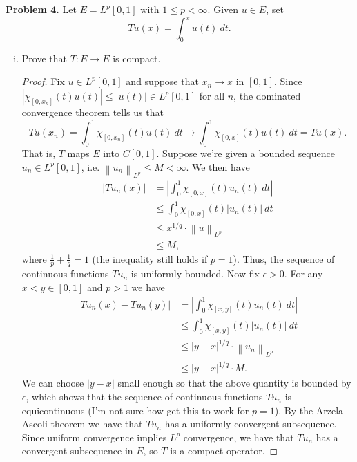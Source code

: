 \documentclass[11pt,letterpaper]{report}
\newcommand{\Lp}[2]{\left\|{#1}\right\|_{L^{#2}}}
\begin{document}
\noindent\textbf{Problem 4. }
Let $E = L^p[0,1]$ with $1\leq p<\infty$. Given $u\in E$, set
\[
Tu(x) = \int_0^xu(t)\ dt.
\]
\begin{enumerate}[(i)]
	\item Prove that $T:E\to E$ is compact.
	\begin{proof}
		Fix $u\in L^p[0,1]$ and suppose that $x_n\to x$ in $[0,1]$. Since $|\chi_{[0, x_n]}(t)u(t)|\leq |u(t)|\in L^p[0,1]$ for all $n$, the dominated convergence theorem tells us that
		\[
			Tu(x_n) = \int_0^1\chi_{[0, x_n]}(t)u(t)\ dt \to \int_0^1 \chi_{[0, x]}(t)u(t)\ dt = Tu(x).
		\]
		That is, $T$ maps $E$ into $C[0,1]$. Suppose we're given a bounded sequence $u_n\in L^p[0,1]$, i.e. $\Lp{u_n}{p}\leq M<\infty$. We then have
		\begin{align*}
		|Tu_n(x)| &= \left|\int_0^1\chi_{[0,x]}(t)u_n(t)\ dt\right|\\
		&\leq \int_0^1\chi_{[0,x]}(t)|u_n(t)|\ dt\\
		&\leq x^{1/q}\cdot \Lp{u}{p}\\
		&\leq M,
		\end{align*}
		where $\frac{1}{p}+\frac{1}{q} = 1$ (the inequality still holds if $p = 1$). Thus, the sequence of continuous functions $Tu_n$ is uniformly bounded. Now fix $\epsilon>0$. For any $x<y\in [0,1]$ and $p>1$ we have
		\begin{align*}
			|Tu_n(x) - Tu_n(y)| & = \left|\int_0^1\chi_{[x,y]}(t)u_n(t)\ dt\right|\\
			&\leq \int_0^1\chi_{[x,y]}(t)|u_n(t)|\ dt\\
			&\leq |y-x|^{1/q}\cdot \Lp{u_n}{p}\\
			&\leq |y-x|^{1/q}\cdot M.
		\end{align*}
		We can choose $|y-x|$ small enough so that the above quantity is bounded by $\epsilon$, which shows that the sequence of continuous functions $Tu_n$ is equicontinuous (I'm not sure how get this to work for $p=1$). By the Arzela-Ascoli theorem we have that $Tu_n$ has a uniformly convergent subsequence. Since uniform convergence implies $L^p$ convergence, we have that $Tu_n$ has a convergent subsequence in $E$, so $T$ is a compact operator.
	\end{proof}


\end{enumerate}
\end{document}

